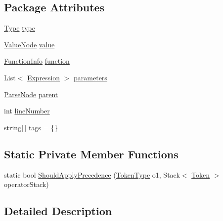 \subsection*{Package Attributes}
\begin{DoxyCompactItemize}
\item 
\hyperlink{a00082_aceddb5496ccffe668bced2d131e4bf86}{Type} \hyperlink{a00082_ad55c92df835006328bc2a79a8f91efb9}{type}
\item 
\hyperlink{a00164}{Value\-Node} \hyperlink{a00082_a569e516782891544c334ff8131b23108}{value}
\item 
\hyperlink{a00084}{Function\-Info} \hyperlink{a00082_a9c1859ce5ad4c86ded8dd0d61da61320}{function}
\item 
List$<$ \hyperlink{a00082}{Expression} $>$ \hyperlink{a00082_a7b21380bead8ae08b2cfc6594edab32c}{parameters}
\item 
\hyperlink{a00122}{Parse\-Node} \hyperlink{a00122_af313a82103fcc2ff5a177dbb06b92f7b}{parent}
\item 
int \hyperlink{a00122_a18b493382de0fde5b4299c1bd2250075}{line\-Number}
\item 
string\mbox{[}$\,$\mbox{]} \hyperlink{a00122_a58b3a15788fd2d4127d73619dc6d04ae}{tags} = \{\}
\end{DoxyCompactItemize}
\subsection*{Static Private Member Functions}
\begin{DoxyCompactItemize}
\item 
static bool \hyperlink{a00082_a5004a8eaa00b2b55856ecb4f339033fb}{Should\-Apply\-Precedence} (\hyperlink{a00031_a301aa7c866593a5b625a8fc158bbeace}{Token\-Type} o1, Stack$<$ \hyperlink{a00149}{Token} $>$ operator\-Stack)
\end{DoxyCompactItemize}


\subsection{Detailed Description}


